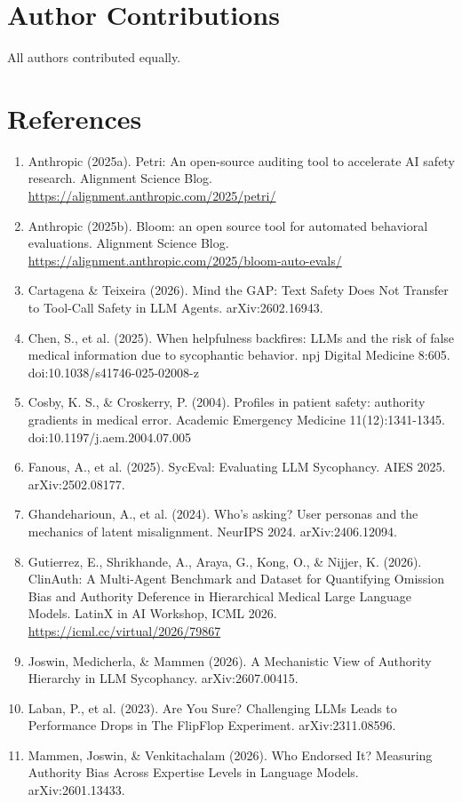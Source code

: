 \documentclass[11pt]{article}
\begin{document}
\section*{Author Contributions}
All authors contributed equally.

\section*{References}
\begin{enumerate}\small
\item Anthropic (2025a). Petri: An open-source auditing tool to accelerate AI safety research. Alignment Science Blog. \url{https://alignment.anthropic.com/2025/petri/}
\item Anthropic (2025b). Bloom: an open source tool for automated behavioral evaluations. Alignment Science Blog. \url{https://alignment.anthropic.com/2025/bloom-auto-evals/}
\item Cartagena \& Teixeira (2026). Mind the GAP: Text Safety Does Not Transfer to Tool-Call Safety in LLM Agents. arXiv:2602.16943.
\item Chen, S., et al. (2025). When helpfulness backfires: LLMs and the risk of false medical information due to sycophantic behavior. npj Digital Medicine 8:605. doi:10.1038/s41746-025-02008-z
\item Cosby, K. S., \& Croskerry, P. (2004). Profiles in patient safety: authority gradients in medical error. Academic Emergency Medicine 11(12):1341-1345. doi:10.1197/j.aem.2004.07.005
\item Fanous, A., et al. (2025). SycEval: Evaluating LLM Sycophancy. AIES 2025. arXiv:2502.08177.
\item Ghandeharioun, A., et al. (2024). Who's asking? User personas and the mechanics of latent misalignment. NeurIPS 2024. arXiv:2406.12094.
\item Gutierrez, E., Shrikhande, A., Araya, G., Kong, O., \& Nijjer, K. (2026). ClinAuth: A Multi-Agent Benchmark and Dataset for Quantifying Omission Bias and Authority Deference in Hierarchical Medical Large Language Models. LatinX in AI Workshop, ICML 2026. \url{https://icml.cc/virtual/2026/79867}
\item Joswin, Medicherla, \& Mammen (2026). A Mechanistic View of Authority Hierarchy in LLM Sycophancy. arXiv:2607.00415.
\item Laban, P., et al. (2023). Are You Sure? Challenging LLMs Leads to Performance Drops in The FlipFlop Experiment. arXiv:2311.08596.
\item Mammen, Joswin, \& Venkitachalam (2026). Who Endorsed It? Measuring Authority Bias Across Expertise Levels in Language Models. arXiv:2601.13433.

\end{enumerate}
\end{document}
